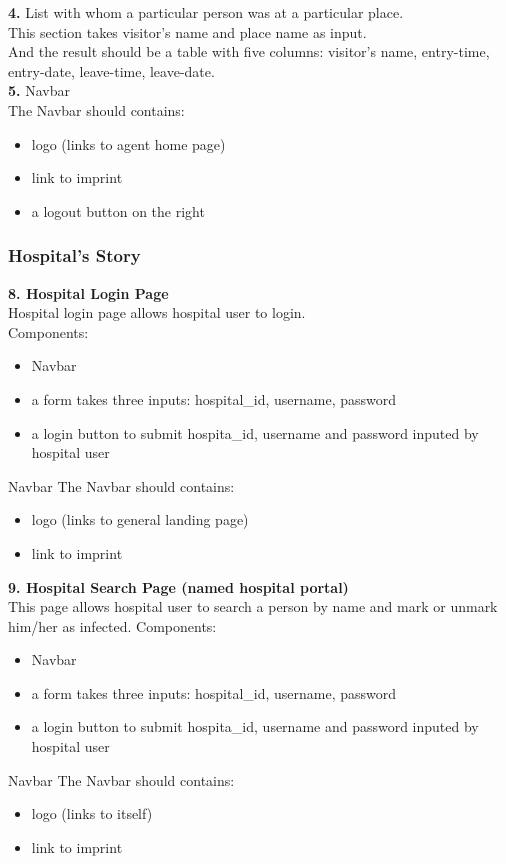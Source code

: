 \documentclass{article}
\begin{document}
\textbf{4.} List with whom a particular person was at a particular place.\\
This section takes visitor's name and place name as input.\\
And the result should be a table with five columns: visitor's name, entry-time, entry-date, leave-time, leave-date.\\
\textbf{5.} Navbar\\
The Navbar should contains:
\begin{itemize}
	\item logo (links to agent home page)
	\item link to imprint
	\item a logout button on the right
\end{itemize}


\subsubsection*{Hospital's Story}
\textbf{8. Hospital Login Page}\\
Hospital login page allows hospital user to login.\\
Components:\\
\begin{itemize}
	\item Navbar
	\item a form takes three inputs: hospital\_id, username, password
	\item a login button to submit hospita\_id, username and password inputed by hospital user
\end{itemize}
Navbar
The Navbar should contains:
\begin{itemize}
	\item logo (links to general landing page)
	\item link to imprint
\end{itemize}

\textbf{9. Hospital Search Page (named hospital portal)}\\
This page allows hospital user to search a person by name and mark or unmark him/her as infected.
Components:\\
\begin{itemize}
	\item Navbar
	\item a form takes three inputs: hospital\_id, username, password
	\item a login button to submit hospita\_id, username and password inputed by hospital user
\end{itemize}
Navbar
The Navbar should contains:
\begin{itemize}
	\item logo (links to itself)
	\item link to imprint
\end{itemize}
\end{document}
